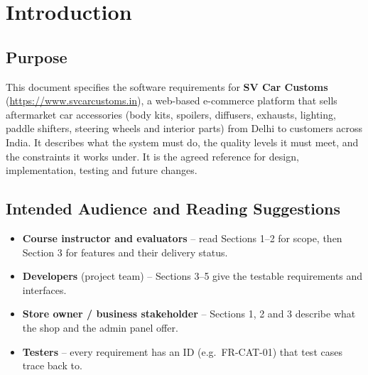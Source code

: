 \documentclass[11pt,a4paper]{article}
\newcommand{\newsection}[1]{\clearpage\section{#1}}
\begin{document}
\newsection{Introduction}
\subsection{Purpose}
This document specifies the software requirements for \textbf{SV Car Customs}
(\url{https://www.svcarcustoms.in}), a web-based e-commerce platform that sells
aftermarket car accessories (body kits, spoilers, diffusers, exhausts, lighting,
paddle shifters, steering wheels and interior parts) from Delhi to customers across
India. It describes what the system must do, the quality levels it must meet, and the
constraints it works under. It is the agreed reference for design, implementation,
testing and future changes.

\subsection{Intended Audience and Reading Suggestions}
\begin{itemize}
  \item \textbf{Course instructor and evaluators} -- read Sections 1--2 for scope, then
        Section 3 for features and their delivery status.
  \item \textbf{Developers} (project team) -- Sections 3--5 give the testable
        requirements and interfaces.
  \item \textbf{Store owner / business stakeholder} -- Sections 1, 2 and 3 describe what
        the shop and the admin panel offer.
  \item \textbf{Testers} -- every requirement has an ID (e.g.\ FR-CAT-01) that test cases
        trace back to.
\end{itemize}
\end{document}
